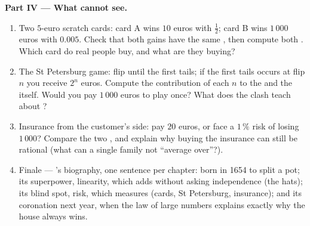 \begin{problem}
\medskip
\noindent\textbf{Part IV --- What  cannot see.}
\begin{enumerate}[resume]
  \item Two $5$-euro scratch cards: card A wins $10$ euros with
         $\frac12$; card B wins $1\,000$ euros with
         $0.005$. Check that both gains have the
        same , then compute both . Which
        card do real people buy, and what are they buying?
  \item The St Petersburg game: flip until the first tails;
        if the first tails occurs at flip $n$ you receive
        $2^n$ euros. Compute the contribution of each $n$ to
        the  and the  itself. Would you
        pay $1\,000$ euros to play once? What does the clash
        teach about ?
  \item Insurance from the customer's side: pay $20$ euros, or
        face a $1\,\%$ risk of losing $1\,000$? Compare the two
        , and explain why buying the insurance can
        still be rational (what can a single family not
        ``average over''?).
  \item Finale --- 's biography, one sentence per
        chapter: born in 1654 to split a pot; its superpower,
        linearity, which adds  without asking
        independence (the hats); its blind spot, risk, which
         measures (cards, St Petersburg, insurance);
        and its coronation next year, when the law of large
        numbers explains exactly why the house always wins.
\end{enumerate}
\end{problem}
